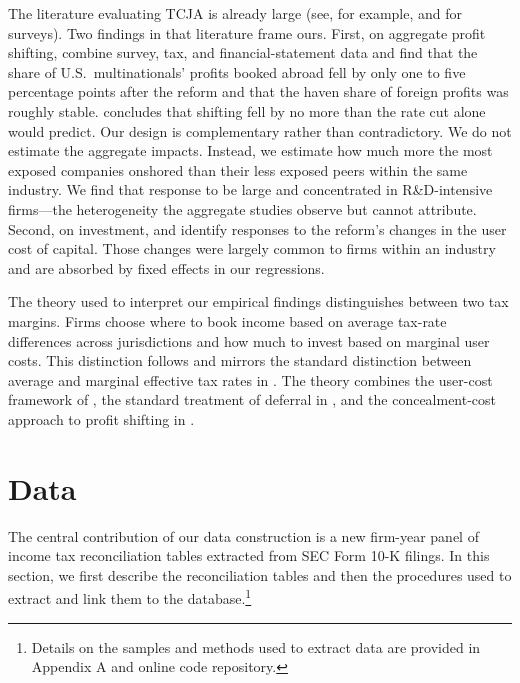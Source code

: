 \documentclass[11pt,letterpaper]{article}
\begin{document}
The literature evaluating TCJA is already large (see, for example, 
\citet{Dharmapala2024} and \citet{GravelleMarples2025} for surveys).  
Two findings in that literature frame ours. First, on aggregate profit shifting, 
\citet{GarciaBernardoJanskyZucman2026} combine survey, tax, and financial-statement 
data and find that the share of U.S.~multinationals' profits booked abroad fell by 
only one to five percentage points after the reform and that the haven share 
of foreign profits was roughly stable.
\citet{Dharmapala2024} concludes that shifting fell by no more than the rate 
cut alone would predict. Our design is complementary rather than contradictory. 
We do not estimate the aggregate impacts. Instead, we estimate how much more the 
most exposed companies onshored than their less exposed peers within the 
same industry. We find that response to be large and concentrated 
in R\&D-intensive firms---the heterogeneity the aggregate studies observe 
but cannot attribute. Second, on investment, \citet{CSZZ2024} and 
\citet{KennedyDobridgeLandefeldMortenson2022} identify responses to the 
reform's changes in the user cost of capital. Those changes were largely 
common to firms within an industry and are absorbed by fixed effects in our
regressions. 

The theory used to interpret our empirical findings distinguishes between two tax
margins. Firms choose where to book income based on average tax-rate differences
across jurisdictions and how much to invest based on marginal user costs.
This distinction follows \citet{GrubertSlemrod1998} and mirrors the standard
distinction between average and marginal effective tax rates in
\citet{DevereuxGriffith1998, DevereuxGriffith2003}. The theory combines the
user-cost framework of \citet{HallJorgenson1967}, the standard treatment of
deferral in \citet{Hartman1985}, and the concealment-cost approach to profit
shifting in \citet{HinesRice1994}.


\section{Data\label{sec:Data}}

The central contribution of our data construction is a new firm-year 
panel of income tax reconciliation tables extracted from SEC Form 
10-K filings. In this section, we first describe the reconciliation 
tables and then the procedures used to extract and link them to the
\citet{CompustatAnnual} database.\footnote{%
Details on the samples and methods used to extract data 
are provided in Appendix A and online code repository.}
\end{document}

